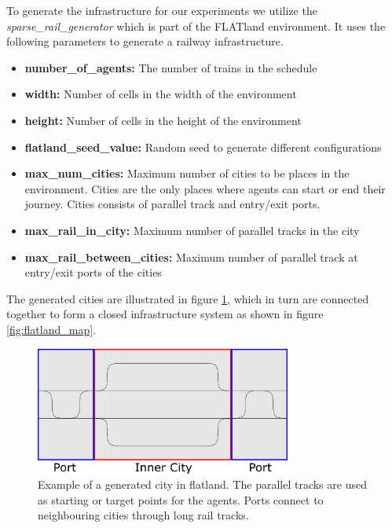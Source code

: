 \documentclass{article}
\begin{document}
To generate the infrastructure for our experiments we utilize the \textit{sparse\_rail\_generator} which is part of the FLATland environment. It uses the following parameters to generate a railway infrastructure.

 \begin{itemize}
    \item \textbf{number\_of\_agents:} The number of trains in the schedule
    \item \textbf{width:} Number of cells in the width of the environment
    \item \textbf{height:} Number of cells in the height of the environment
    \item \textbf{flatland\_seed\_value:} Random seed to generate different configurations
    \item \textbf{max\_num\_cities:} Maximum number of cities to be places in the environment. Cities are the only places where agents can start or end their journey. Cities consists of parallel track and entry/exit ports.
    \item \textbf{max\_rail\_in\_city:} Maximum number of parallel tracks in the city
    \item \textbf{max\_rail\_between\_cities:} Maximum number of parallel track at entry/exit ports of the cities
 \end{itemize}

The generated cities are illustrated in figure \ref{fig:city_structure}, which in turn are connected together to form a closed infrastructure system as shown in figure \ref{fig:flatland_map}.

\begin{figure}[hbtp]
	\centering
  \includegraphics[width=0.75\textwidth]{Figures/city_structure.png}
	\caption{Example of a generated city in flatland. The parallel tracks are used as starting or target points for the agents. Ports connect to neighbouring cities through long rail tracks.}
	\label{fig:city_structure}
\end{figure}
\end{document}
